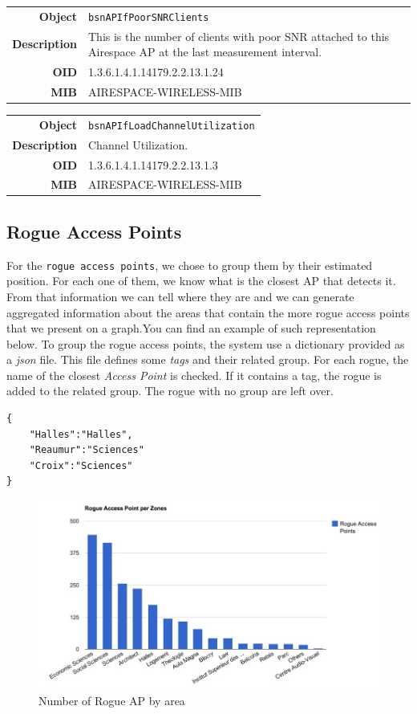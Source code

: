 \begin{tabular}{|r l|}
\hline
\textbf{Object} & \texttt{bsnAPIfPoorSNRClients} \\
\textbf{Description} & \parbox{11cm}{This is the number of clients with poor SNR attached to this Airespace AP at the last measurement interval.} \\
\textbf{OID} & 1.3.6.1.4.1.14179.2.2.13.1.24 \\
\textbf{MIB} & AIRESPACE-WIRELESS-MIB \\
\hline
\end{tabular}

\begin{tabular}{|r l|}
\hline
\textbf{Object} & \texttt{bsnAPIfLoadChannelUtilization} \\
\textbf{Description} & \parbox{11cm}{Channel Utilization.} \\
\textbf{OID} & 1.3.6.1.4.1.14179.2.2.13.1.3 \\
\textbf{MIB} & AIRESPACE-WIRELESS-MIB \\
\hline
\end{tabular}

\subsection{Rogue Access Points}
For the \texttt{rogue access points}, we chose to group them by their estimated position. For each one of them, we know what is the closest AP that detects it. From that information we can tell where they are and we can generate aggregated information about the areas that contain the more rogue access points that we present on a graph.You can find an example of such representation below. To group the rogue access points, the system use a dictionary provided as a \emph{json} file. This file defines some \emph{tags} and their related group. For each rogue, the name of the closest \emph{Access Point} is checked. If it contains a tag, the rogue is added to the related group. The rogue with no group are left over.

\begin{lstlisting}[frame=single,breaklines=true,caption={Example of a Zone Dictionary}]
{
	"Halles":"Halles",
	"Reaumur":"Sciences"
	"Croix":"Sciences"	
}
\end{lstlisting}

\begin{figure}[H]
   \includegraphics[width=\textwidth]{Pictures/chapter5/rogue-ap.jpg}
   \caption{Number of Rogue AP by area}
\end{figure}

